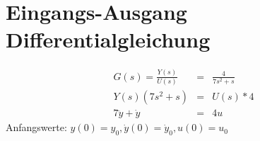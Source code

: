 \section{Eingangs-Ausgang Differentialgleichung}

\begin{eqnarray*}
    G(s) =\frac{Y(s)}{U(s)} &=& \frac{4}{7s^2+s} \\
    Y(s)(7s^2+s) &=& U(s) * 4 \\
     7 \ddot y +  \dot y &=& 4u
\end{eqnarray*}
Anfangswerte: \(y(0)=y_0, \dot y(0)=\dot y_0, u(0)=u_0\)
